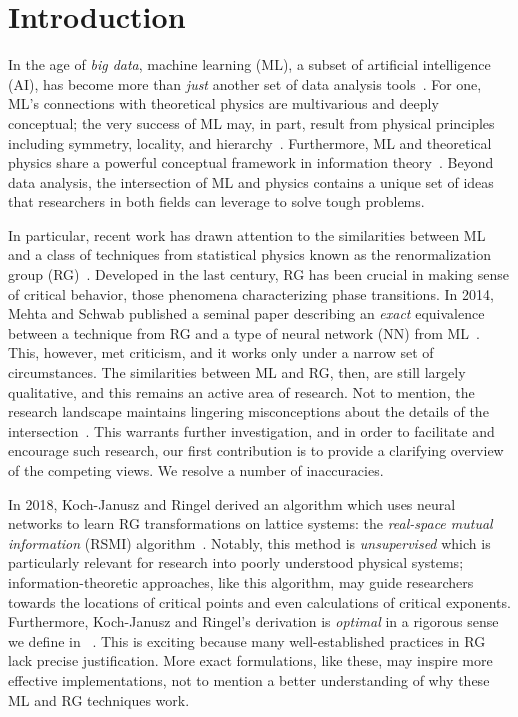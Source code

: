 \chapter{Introduction}

In the age of \textit{big data}, machine learning (ML), a subset of
artificial intelligence (AI), has become more than \textit{just}
another set of data analysis tools~\cite{deep-learning}. For one, ML's
connections with theoretical physics are multivarious and deeply
conceptual; the very success of ML may, in part, result from physical
principles including symmetry, locality, and
hierarchy~\cite{lin}. Furthermore, ML and theoretical physics share a
powerful conceptual framework in information
theory~\cite{tishby}. Beyond data analysis, the intersection of ML and
physics contains a unique set of ideas that researchers in both fields
can leverage to solve tough problems.

In particular, recent work has drawn attention to the similarities
between ML and a class of techniques from statistical physics known as
the renormalization group (RG)~\cite{mehta,kjr,iso,lin}. Developed in
the last century, RG has been crucial in making sense of critical
behavior, those phenomena characterizing phase transitions. In 2014,
Mehta and Schwab published a seminal paper describing an
\textit{exact} equivalence between a technique from RG and a type of
neural network (NN) from ML~\cite{mehta}. This, however, met
criticism, and it works only under a narrow set of circumstances. The
similarities between ML and RG, then, are still largely qualitative,
and this remains an active area of research. Not to mention, the
research landscape maintains lingering misconceptions about the
details of the intersection~\cite{iso, lin, mehta-reply, hoeve}. This
warrants further investigation, and in order to facilitate and
encourage such research, our first contribution is to provide a
clarifying overview of the competing views. We resolve a number of
inaccuracies.

In 2018, Koch-Janusz and Ringel derived an algorithm which uses neural
networks to learn RG transformations on lattice systems: the
\textit{real-space mutual information} (RSMI)
algorithm~\cite{kjr}. Notably, this method is \textit{unsupervised}
which is particularly relevant for research into poorly understood
physical systems; information-theoretic approaches, like this
algorithm, may guide researchers towards the locations of critical
points and even calculations of critical exponents. Furthermore,
Koch-Janusz and Ringel's derivation is \textit{optimal} in a rigorous
sense we define in ~\cite{kjr,lenggenhager}. This is
exciting because many well-established practices in RG lack precise
justification. More exact formulations, like these, may inspire more
effective implementations, not to mention a better understanding of
why these ML and RG techniques work.


